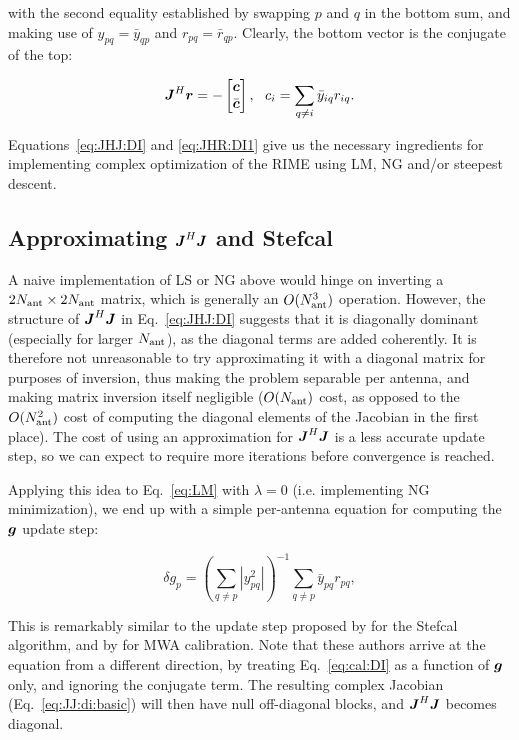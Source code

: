 \documentclass[useAMS,usenatbib]{mn2e}
\newcommand{\mat}[1]{{\bmath{#1}}}
\newcommand{\JJ}{\mat{J}} %
\newcommand{\JHJ}{\JJ^H\JJ} %
\begin{document}
with the second equality established by swapping $p$ and $q$ in the bottom sum, and making use of $y_{pq}=\bar{y}_{qp}$ and $r_{pq}=\bar{r}_{qp}$. Clearly, the bottom vector is the conjugate of the top:

\begin{equation}
\label{eq:JHR:DI1}
\JJ^H\bmath{r} = -\Matrix{c}{\bmath{c}\\\bar{\bmath{c}}},~~c_i = \sum\limits_{q\ne i} \bar{y}_{iq} r_{iq}.
\end{equation}

Equations~\ref{eq:JHJ:DI} and \ref{eq:JHR:DI1} give us the necessary ingredients for implementing complex
optimization of the RIME using LM, NG and/or steepest descent. 

\subsection{Approximating $\JJ^H\JJ$ and Stefcal}
\label{sec:DI:stefcal}

A naive implementation of LS or NG above would hinge on inverting a $2N_\mathrm{ant}\times2N_\mathrm{ant}$ matrix, which is generally 
an $O(N_\mathrm{ant}^3)$ operation. However, the structure of $\JJ^H\JJ$ in Eq.~\ref{eq:JHJ:DI} suggests that it is diagonally 
dominant (especially for larger $N_\mathrm{ant}$), as the diagonal terms are added coherently. It is therefore not unreasonable 
to try approximating it with a diagonal matrix for purposes of inversion, thus making the problem separable per antenna,
and making matrix inversion itself negligible ($O(N_\mathrm{ant})$ cost, as opposed to the $O(N_\mathrm{ant}^2)$ cost of computing the 
diagonal elements of the Jacobian in the first place). The cost of using an approximation for $\JHJ$ is a less accurate
update step, so we can expect to require more iterations before convergence is reached.

Applying this idea to Eq.~\ref{eq:LM} with $\lambda=0$ (i.e. implementing NG minimization), we end up with a 
simple per-antenna equation for computing the $\bmath{g}$ update step:

\begin{equation}
\label{eq:stefcal}
\delta g_p = \left( \sum\limits_{q\ne p} |y^2_{pq}|  \right )^{-1} \sum\limits_{q\ne p} \bar{y}_{pq} r_{pq},
\end{equation}

This is remarkably similar to the update step proposed by \citet{Stefcal} for the Stefcal algorithm, 
and by \citet{Mitchell-RTS} for MWA calibration. Note that these authors arrive at the equation from a different 
direction, by treating Eq.~\ref{eq:cal:DI} as a function of $\bmath{g}$ only, and ignoring the conjugate term. The 
resulting complex Jacobian (Eq.~\ref{eq:JJ:di:basic}) will then have null off-diagonal blocks, and $\JJ^H\JJ$ becomes 
diagonal.
\end{document}
